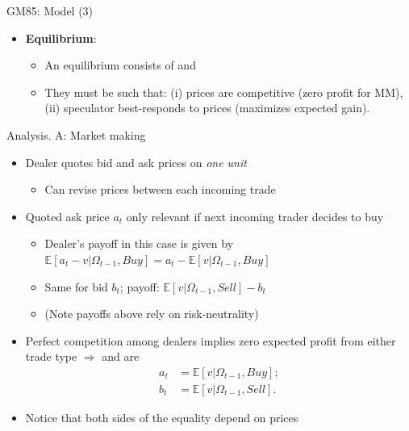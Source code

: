 \documentclass[english,10pt
,aspectratio=169
]{beamer}
\begin{document}
\begin{frame}{GM85: Model (3)}
	\begin{itemize}
		\item \textbf{Equilibrium}:
		\begin{itemize}
			\item An equilibrium consists of  and 
			\item They must be such that: (i) prices are competitive (zero profit for MM), (ii) speculator best-responds to prices (maximizes expected gain).
		\end{itemize}
	\end{itemize}
\end{frame}


\begin{frame}{Analysis. A: Market making}
	\begin{itemize}
		\item Dealer quotes bid and ask prices on \textit{one unit}
		\begin{itemize}
			\item Can revise prices between each incoming trade
		\end{itemize}
		\item Quoted ask price $a_t$ only relevant if next incoming trader decides to buy
		\begin{itemize}
			\item Dealer's payoff in this case is given by $\mathbb{E}[a_t-v|\Omega_{t-1}, Buy] = a_t - \mathbb{E}[v|\Omega_{t-1}, Buy]$
			\item Same for bid $b_t$; payoff: $\mathbb{E}[v|\Omega_{t-1}, Sell] - b_t$
			\item (Note payoffs above rely on risk-neutrality)
		\end{itemize}
		\item Perfect competition among dealers implies zero expected profit from either trade type $\Rightarrow$  and  are
		\begin{align*}
			a_t & = \mathbb{E}[v|\Omega_{t-1}, Buy]; \\
			b_t &= \mathbb{E}[v|\Omega_{t-1},  Sell].
		\end{align*}
		\item Notice that both sides of the equality depend on prices
	\end{itemize}
\end{frame}
\end{document}
